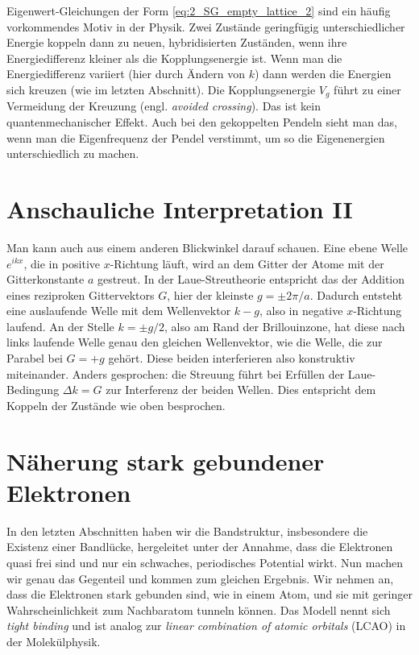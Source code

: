Eigenwert-Gleichungen der Form \ref{eq:2_SG_empty_lattice_2} sind ein häufig vorkommendes Motiv in der Physik. Zwei Zustände geringfügig unterschiedlicher Energie koppeln dann zu neuen, hybridisierten Zuständen, wenn ihre Energiedifferenz kleiner als die Kopplungsenergie ist. Wenn man die Energiedifferenz variiert (hier durch Ändern von $k$) dann werden die Energien sich kreuzen (wie im letzten Abschnitt). Die Kopplungsenergie $V_g$ führt zu einer Vermeidung der Kreuzung (engl. \emph{avoided crossing}). Das ist kein quantenmechanischer Effekt. Auch bei den gekoppelten Pendeln sieht man das, wenn man die Eigenfrequenz der Pendel verstimmt, um so die Eigenenergien unterschiedlich zu machen.


\section*{Anschauliche Interpretation II}

Man kann auch aus einem anderen Blickwinkel darauf schauen. Eine ebene Welle $e^{i k x}$, die in positive $x$-Richtung läuft, wird an dem Gitter der Atome mit der Gitterkonstante $a$ gestreut.  In der Laue-Streutheorie entspricht das der Addition eines reziproken Gittervektors $G$, hier der kleinste $g = \pm 2 \pi /a$. Dadurch entsteht eine auslaufende Welle mit dem Wellenvektor $k - g$, also in negative $x$-Richtung laufend.  An der Stelle $k = \pm g/2$, also am Rand der Brillouinzone, hat diese nach links laufende Welle genau den gleichen Wellenvektor, wie die Welle, die zur Parabel bei $G=+g$ gehört. Diese beiden interferieren also konstruktiv miteinander. Anders gesprochen: die Streuung führt bei Erfüllen der Laue-Bedingung $\Delta k = G$ zur Interferenz der beiden Wellen. Dies entspricht dem Koppeln der Zustände wie oben besprochen.


\section*{Näherung stark gebundener Elektronen}

In den letzten Abschnitten haben wir die Bandstruktur, insbesondere die Existenz einer Bandlücke, hergeleitet unter der Annahme, dass die Elektronen quasi frei sind und nur ein schwaches, periodisches Potential wirkt. Nun machen wir genau das Gegenteil und kommen zum gleichen Ergebnis. Wir nehmen an, dass die Elektronen stark gebunden sind, wie in einem Atom, und sie mit geringer Wahrscheinlichkeit zum Nachbaratom tunneln können. Das Modell nennt sich \emph{tight binding} und ist analog zur \emph{linear combination of atomic orbitals} (LCAO) in der Molekülphysik.

